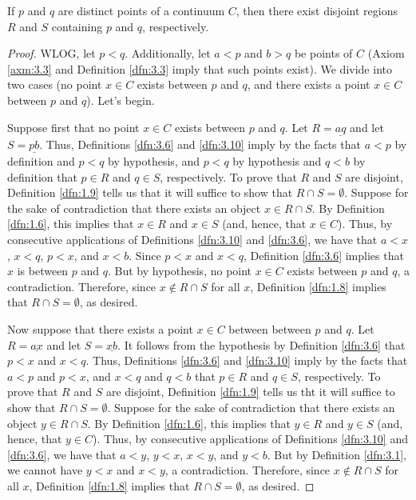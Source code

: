 \documentclass[../main.tex]{subfiles}
\begin{document}
\begin{theorem}\label{trm:3.22}
    If $p$ and $q$ are distinct points of a continuum $C$, then there exist disjoint regions $R$ and $S$ containing $p$ and $q$, respectively.
    \begin{proof}
        WLOG, let $p<q$. Additionally, let $a<p$ and $b>q$ be points of $C$ (Axiom \ref{axm:3.3} and Definition \ref{dfn:3.3} imply that such points exist). We divide into two cases (no point $x\in C$ exists between $p$ and $q$, and there exists a point $x\in C$ between $p$ and $q$). Let's begin.\par
        Suppose first that no point $x\in C$ exists between $p$ and $q$. Let $R=\underline{aq}$ and let $S=\underline{pb}$. Thus, Definitions \ref{dfn:3.6} and \ref{dfn:3.10} imply by the facts that $a<p$ by definition and $p<q$ by hypothesis, and $p<q$ by hypothesis and $q<b$ by definition that $p\in R$ and $q\in S$, respectively. To prove that $R$ and $S$ are disjoint, Definition \ref{dfn:1.9} tells us that it will suffice to show that $R\cap S=\emptyset$. Suppose for the sake of contradiction that there exists an object $x\in R\cap S$. By Definition \ref{dfn:1.6}, this implies that $x\in R$ and $x\in S$ (and, hence, that $x\in C$). Thus, by consecutive applications of Definitions \ref{dfn:3.10} and \ref{dfn:3.6}, we have that $a<x$, $x<q$, $p<x$, and $x<b$. Since $p<x$ and $x<q$, Definition \ref{dfn:3.6} implies that $x$ is between $p$ and $q$. But by hypothesis, no point $x\in C$ exists between $p$ and $q$, a contradiction. Therefore, since $x\notin R\cap S$ for all $x$, Definition \ref{dfn:1.8} implies that $R\cap S=\emptyset$, as desired.\par
        Now suppose that there exists a point $x\in C$ between between $p$ and $q$. Let $R=\underline{ax}$ and let $S=\underline{xb}$. It follows from the hypothesis by Definition \ref{dfn:3.6} that $p<x$ and $x<q$. Thus, Definitions \ref{dfn:3.6} and \ref{dfn:3.10} imply by the facts that $a<p$ and $p<x$, and $x<q$ and $q<b$ that $p\in R$ and $q\in S$, respectively. To prove that $R$ and $S$ are disjoint, Definition \ref{dfn:1.9} tells us tht it will suffice to show that $R\cap S=\emptyset$. Suppose for the sake of contradiction that there exists an object $y\in R\cap S$. By Definition \ref{dfn:1.6}, this implies that $y\in R$ and $y\in S$ (and, hence, that $y\in C$). Thus, by consecutive applications of Definitions \ref{dfn:3.10} and \ref{dfn:3.6}, we have that $a<y$, $y<x$, $x<y$, and $y<b$. But by Definition \ref{dfn:3.1}, we cannot have $y<x$ and $x<y$, a contradiction. Therefore, since $x\notin R\cap S$ for all $x$, Definition \ref{dfn:1.8} implies that $R\cap S=\emptyset$, as desired.
    \end{proof}
\end{theorem}
\end{document}
